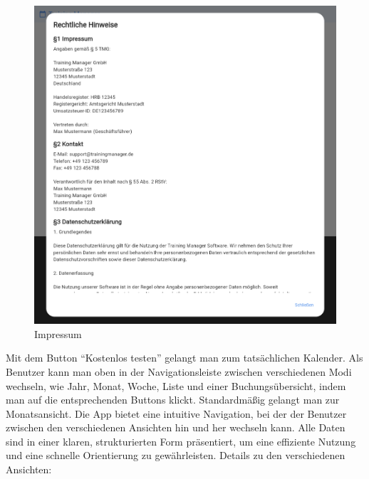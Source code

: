 \begin{figure}[htbp!]
        \centering
        \includegraphics[scale=0.2]{img/flutter_32.png}
        \caption{Impressum}
        \label{Imp}
    \end{figure}
Mit dem Button “Kostenlos testen” gelangt man zum tatsächlichen Kalender.
Als Benutzer kann man oben in der Navigationsleiste zwischen verschiedenen Modi wechseln, wie Jahr, Monat, Woche, Liste und einer Buchungsübersicht, indem man auf die entsprechenden Buttons klickt. Standardmäßig gelangt man zur Monatsansicht.
Die App bietet eine intuitive Navigation, bei der der Benutzer zwischen den verschiedenen Ansichten hin und her wechseln kann. Alle Daten sind in einer klaren, strukturierten Form präsentiert, um eine effiziente Nutzung und eine schnelle Orientierung zu gewährleisten.
Details zu den verschiedenen Ansichten:
